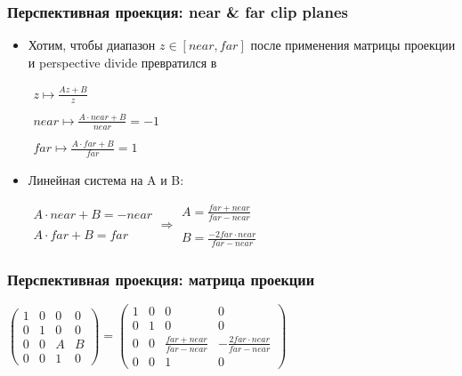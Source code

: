 \documentclass{beamer}
\begin{document}
\begin{frame}[fragile]
\frametitle{Перспективная проекция: near \& far clip planes}
\begin{itemize}
\item Хотим, чтобы диапазон \begin{math}z\in [near,far]\end{math} после применения матрицы проекции и perspective divide превратился в \begin{math}[-1,1]\end{math}
\pause
\begin{center}
\begin{math}
\begin{matrix}
z \mapsto \frac{Az + B}{z} \\ \\
near \mapsto \frac{A\cdot near + B}{near} = -1 \\ \\
far \mapsto \frac{A\cdot far + B}{far} = 1
\end{matrix}
\end{math}
\end{center}
\pause
\item Линейная система на A и B:
\begin{center}
\begin{math}
\begin{matrix}
A \cdot near + B = -near \\ \\
A \cdot far + B = far
\end{matrix}
\Rightarrow
\begin{matrix}
A = \frac{far + near}{far - near} \\ \\
B = \frac{-2 far \cdot near}{far - near}
\end{matrix}
\end{math}
\end{center}
\end{itemize}
\end{frame}

\begin{frame}[fragile]
\frametitle{Перспективная проекция: матрица проекции}
\begin{center}
\begin{math}
\begin{pmatrix}
1 & 0 & 0 & 0 \\
0 & 1 & 0 & 0 \\
0 & 0 & A & B \\
0 & 0 & 1 & 0
\end{pmatrix}
=
\begin{pmatrix}
1 & 0 & 0 & 0 \\
0 & 1 & 0 & 0 \\
0 & 0 & \frac{far + near}{far - near} & -\frac{2 far \cdot near}{far - near} \\
0 & 0 & 1 & 0
\end{pmatrix}
\end{math}
\end{center}
\end{frame}
\end{document}
